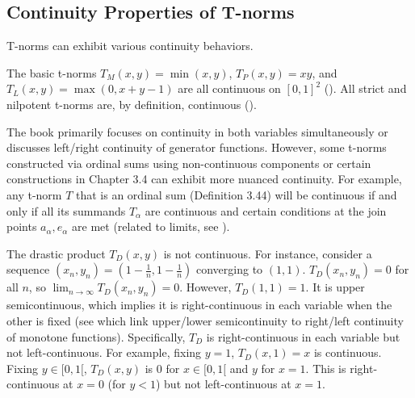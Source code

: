\subsection{Continuity Properties of T-norms}

T-norms can exhibit various continuity behaviors.

\begin{example}
  The basic t-norms $T_M(x,y) = \min(x,y)$, $T_P(x,y) = xy$, and $T_L(x,y) = \max(0, x+y-1)$ are all continuous on $[0,1]^2$ (\cite[p.~15]{Klement2000}). All strict and nilpotent t-norms are, by definition, continuous (\cite[Definition 2.13, p.~42]{Klement2000}).
\end{example}

\begin{remark}
  The book primarily focuses on continuity in both variables simultaneously or discusses left/right continuity of generator functions. However, some t-norms constructed via ordinal sums using non-continuous components or certain constructions in Chapter 3.4 can exhibit more nuanced continuity.
  For example, any t-norm $T$ that is an ordinal sum (Definition 3.44) will be continuous if and only if all its summands $T_\alpha$ are continuous and certain conditions at the join points $a_\alpha, e_\alpha$ are met (related to limits, see \cite[Proposition 3.49, p.~100]{Klement2000}).
\end{remark}

\begin{example}
  The drastic product $T_D(x,y)$ is not continuous. For instance, consider a sequence $(x_n, y_n) = (1-\frac{1}{n}, 1-\frac{1}{n})$ converging to $(1,1)$.
  $T_D(x_n, y_n) = 0$ for all $n$, so $\lim_{n\to\infty} T_D(x_n, y_n) = 0$.
  However, $T_D(1,1) = 1$.
  It is upper semicontinuous, which implies it is right-continuous in each variable when the other is fixed (see \cite[Remark 1.21, Proposition 1.22]{Klement2000} which link upper/lower semicontinuity to right/left continuity of monotone functions).
  Specifically, $T_D$ is right-continuous in each variable but not left-continuous. For example, fixing $y=1$, $T_D(x,1)=x$ is continuous. Fixing $y \in [0,1[$, $T_D(x,y)$ is $0$ for $x \in [0,1[$ and $y$ for $x=1$. This is right-continuous at $x=0$ (for $y<1$) but not left-continuous at $x=1$.
\end{example}


